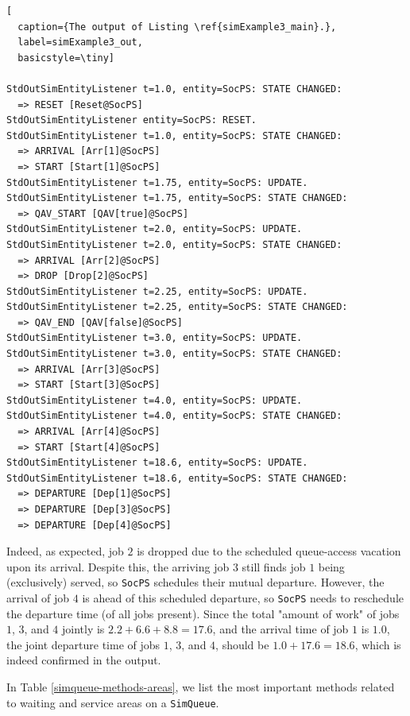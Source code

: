 \begin{lstfloat}
\begin{lstlisting}[
  caption={The output of Listing \ref{simExample3_main}.},
  label=simExample3_out,
  basicstyle=\tiny]

StdOutSimEntityListener t=1.0, entity=SocPS: STATE CHANGED:
  => RESET [Reset@SocPS]
StdOutSimEntityListener entity=SocPS: RESET.
StdOutSimEntityListener t=1.0, entity=SocPS: STATE CHANGED:
  => ARRIVAL [Arr[1]@SocPS]
  => START [Start[1]@SocPS]
StdOutSimEntityListener t=1.75, entity=SocPS: UPDATE.
StdOutSimEntityListener t=1.75, entity=SocPS: STATE CHANGED:
  => QAV_START [QAV[true]@SocPS]
StdOutSimEntityListener t=2.0, entity=SocPS: UPDATE.
StdOutSimEntityListener t=2.0, entity=SocPS: STATE CHANGED:
  => ARRIVAL [Arr[2]@SocPS]
  => DROP [Drop[2]@SocPS]
StdOutSimEntityListener t=2.25, entity=SocPS: UPDATE.
StdOutSimEntityListener t=2.25, entity=SocPS: STATE CHANGED:
  => QAV_END [QAV[false]@SocPS]
StdOutSimEntityListener t=3.0, entity=SocPS: UPDATE.
StdOutSimEntityListener t=3.0, entity=SocPS: STATE CHANGED:
  => ARRIVAL [Arr[3]@SocPS]
  => START [Start[3]@SocPS]
StdOutSimEntityListener t=4.0, entity=SocPS: UPDATE.
StdOutSimEntityListener t=4.0, entity=SocPS: STATE CHANGED:
  => ARRIVAL [Arr[4]@SocPS]
  => START [Start[4]@SocPS]
StdOutSimEntityListener t=18.6, entity=SocPS: UPDATE.
StdOutSimEntityListener t=18.6, entity=SocPS: STATE CHANGED:
  => DEPARTURE [Dep[1]@SocPS]
  => DEPARTURE [Dep[3]@SocPS]
  => DEPARTURE [Dep[4]@SocPS]

\end{lstlisting}
\end{lstfloat}

Indeed, as expected, job $2$ is dropped due to the scheduled queue-access vacation
  upon its arrival.
Despite this,
  the arriving job $3$ still finds job $1$ being (exclusively) served,
  so \lstinline|SocPS| schedules their mutual departure.
However,
  the arrival of job $4$ is ahead of this scheduled departure,
  so \lstinline|SocPS| needs to reschedule the departure time
  (of all jobs present).
Since the total "amount of work"
  of jobs $1$, $3$, and $4$ jointly is $2.2 + 6.6 + 8.8 = 17.6$,
  and the arrival time of job $1$ is $1.0$,
  the joint departure time of jobs $1$, $3$, and $4$,
  should be $1.0+17.6=18.6$,
  which is indeed confirmed in the output.

In Table \ref{simqueue-methods-areas},
  we list the most important methods related to waiting and service areas
  on a \lstinline|SimQueue|.

